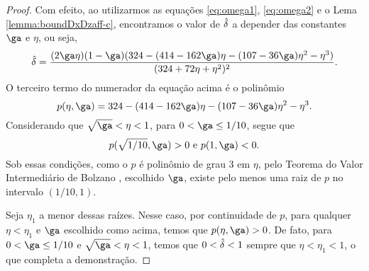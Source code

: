 \begin{proof}
	Com efeito, ao utilizarmos as equações \eqref{eq:omega1}, \eqref{eq:omega2} e o Lema \ref{lemma:boundDxDzaff-c}, encontramos o valor de $\hat{\delta}$ a depender das constantes $\ga$ e $\eta$, ou seja, 
	\begin{equation}
		\label{eq:nextdel-full}
		\nextdel = \frac{(2\ga\eta)(1-\ga)(324 -	(414 - 162\ga)\eta - (107 - 36\ga)\eta^{2} -  \eta^{3})}{(324 + 72\eta + \eta^{2})^{2}}.
	\end{equation}
	O terceiro termo do numerador da equação acima é o polinômio 
	\[
		p(\eta,\ga) =   324 -	(414 - 162\ga)\eta - (107 - 36\ga)\eta^{2} -  \eta^{3}. 
	\]
	Considerando que  $\sqrt{\ga}<\eta<1$, para $0 < \ga \leq 1/10$, segue que
	\[p(\sqrt{1/10},\ga) >0 \text{ e  } p(1,\ga) <0.\]
	Sob essas condições, como o $p$ é polinômio de grau 3 em $\eta$, pelo Teorema do Valor Intermediário de Bolzano \cite[Teorema 5.3.7]{Bartle:2011tr}, escolhido $\ga$, existe pelo menos uma  raiz  de $p$ no intervalo $(1/10,1)$. 

	Seja $\eta_{1}$ a menor dessas raízes. Nesse caso, por continuidade de $p$, para qualquer $\eta  < \eta_{1}$ e $\ga$ escolhido como acima, temos que  $p(\eta,\ga) >0$.  De fato,  para $0 < \ga \leq 1/10$ e  $\sqrt{\ga}<\eta<1$, temos que  $0<\hat{\delta}<1$  sempre que $\eta < \eta_{1} < 1$, o que completa a demonstração.
\end{proof}




	


